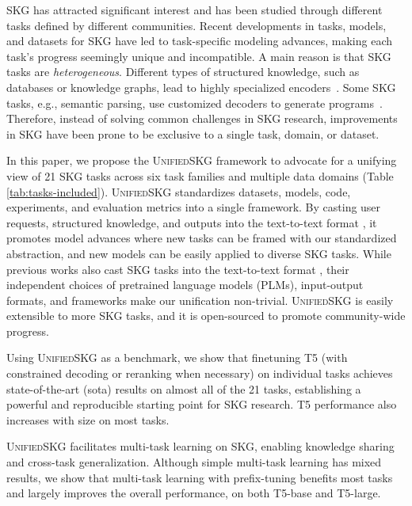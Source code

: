 SKG has attracted significant interest and has been studied through different tasks defined by different communities. Recent developments in tasks, models, and datasets for SKG have led to task-specific modeling advances, making each task's progress seemingly unique and incompatible. A main reason is that SKG tasks are \textit{heterogeneous}.
Different types of structured knowledge, such as databases or knowledge graphs, lead to highly specialized encoders~\citep{kagnet-emnlp19,Herzig2020tapas,Wang2020RATSQLRS,yasunaga-etal-2021-qa}. Some SKG tasks, e.g., semantic parsing, use customized decoders to generate programs~\cite{YinN18,ren2021lego}. Therefore, instead of solving common challenges in SKG research, improvements in SKG have been prone to be exclusive to a single task, domain, or dataset.

In this paper, we propose the \textsc{Unified}SKG framework to advocate for a unifying view of 21 SKG tasks across six task families and multiple data domains (Table \ref{tab:tasks-included}).
\textsc{Unified}SKG standardizes datasets, models, code, experiments, and evaluation metrics into a single framework. By casting user requests, structured knowledge, and outputs into the text-to-text format \cite{2020t5}, it promotes model advances where new tasks can be framed with our standardized abstraction, and new models can be easily applied to diverse SKG tasks. While previous works also cast SKG tasks into the text-to-text format \cite{hosseini2020simple,Shaw2021CompositionalGA,liu2021tapex}, their independent choices of pretrained language models (PLMs), input-output formats, and frameworks make our unification non-trivial. 
\textsc{Unified}SKG is easily extensible to more SKG tasks, and it is open-sourced to promote community-wide progress.

Using \textsc{Unified}SKG as a benchmark, we show that finetuning T5 (with constrained decoding or reranking when necessary) on individual tasks achieves state-of-the-art (sota) results on almost all of the 21 tasks, establishing a powerful and reproducible starting point for SKG research. T5 performance also increases with size on most tasks. 

\textsc{Unified}SKG facilitates multi-task learning on SKG, enabling knowledge sharing and cross-task generalization. Although simple multi-task learning has mixed results, we show that multi-task learning with prefix-tuning \citep{li2021prefixtuning} benefits most tasks and largely improves the overall performance, on both T5-base and T5-large.

